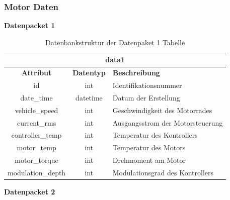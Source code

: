 \subsubsection{Motor Daten}

\textbf{Datenpacket 1}
 
\begin{table}[H]
	\begin{center}
		\begin{tabular}{|c|c|l|}
			\hline
			\multicolumn{3}{|c|}{\textbf{data1}} \\ \hline
			\textbf{Attribut} & \textbf{Datentyp} & \textbf{Beschreibung}            \\ \hline
			id                & int               & Identifikationsnummer            \\ \hline
			date\_time        & datetime          & Datum der Erstellung             \\ \hline
			vehicle\_speed    & int               & Geschwindigkeit des Motorrades   \\ \hline
			current\_rms      & int               & Ausgangsstrom der Motorsteuerung \\ \hline
			controller\_temp  & int               & Temperatur des Kontrollers       \\ \hline
			motor\_temp       & int               & Temperatur des Motors            \\ \hline
			motor\_torque     & int               & Drehmoment am Motor              \\ \hline
			modulation\_depth & int               & Modulationsgrad des Kontrollers  \\ \hline
		\end{tabular}
			\caption{Datenbankstruktur der Datenpaket 1 Tabelle}
			\label{tab:data1}
	\end{center}
\end{table}

\newpage

\textbf{Datenpacket 2}

